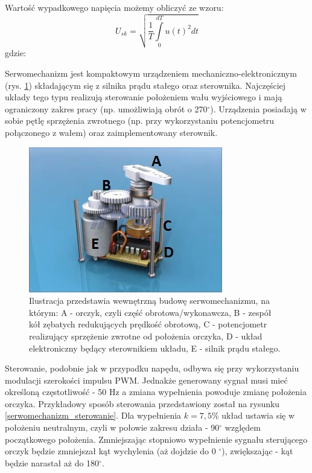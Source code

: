   \noindent
  Wartość wypadkowego napięcia możemy obliczyć ze wzoru:
  \begin{equation}
	U_{sk}=\sqrt{\frac{1}{T}\int\limits_{0}^{dT}u(t)^2dt}
   \label{eq:napiecie_skuteczne}
 \end{equation}
 gdzie:  
 \begin{equationDescriptor}
 \end{equationDescriptor}
 
Serwomechanizm jest kompaktowym urządzeniem mechaniczno-elektronicznym (rys. \ref{serwomechanizm}) składającym się z silnika prądu stałego oraz sterownika. Najczęściej układy tego typu realizują sterowanie położeniem wału wyjściowego i mają ograniczony zakres pracy (np. umożliwiają obrót o 270$^\circ$). Urządzenia posiadają w sobie pętlę sprzężenia zwrotnego (np. przy wykorzystaniu potencjometru połączonego z wałem) oraz zaimplementowany sterownik. 
  \begin{figure}[H]
    \begin{center}
      \includegraphics[scale=0.8]{imgs/serwo.jpg}
 	\caption[Model sewomechanizmu.]{\small{Ilustracja przedstawia wewnętrzną budowę serwomechanizmu, na którym: A - orczyk, czyli część obrotowa/wykonawcza, B - zespół kół zębatych redukujących prędkość obrotową, C - potencjometr realizujący sprzężenie zwrotne od położenia orczyka, D - układ elektroniczny będący sterownikiem układu, E - silnik prądu stałego.}\footnotemark}
	\label{serwomechanizm}
    \end{center}
  \end{figure}  
\noindent
Sterowanie, podobnie jak w przypadku napędu, odbywa się przy wykorzystaniu modulacji szerokości impulsu PWM. Jednakże generowany sygnał musi mieć określoną częstotliwość - 50 Hz a zmiana wypełnienia powoduje zmianę położenia orczyka. Przykładowy sposób sterowania przedstawiony został na rysunku \ref{serwomechanizm_sterowanie}. Dla wypełnienia $k=7,5$\% układ ustawia się w położeniu neutralnym, czyli w połowie zakresu działa - 90$^\circ$ względem początkowego położenia. Zmniejszając stopniowo wypełnienie sygnału sterującego orczyk będzie zmniejszał kąt wychylenia (aż dojdzie do 0 $^\circ$), zwiększając - kąt będzie narastał aż do 180$^\circ$.
